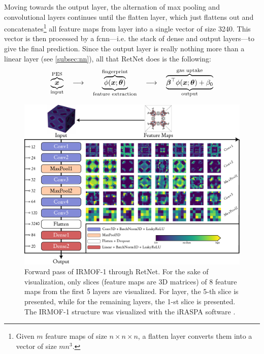 Moving towards the output layer, the alternation of max pooling and
convolutional layers continues until the flatten layer,
which just flattens out and concatenates\footnote{Given $m$ feature maps of size
$n \times n \times n$, a flatten layer converts them into a vector of size
$mn^3$.} all feature maps from  layer into a single vector of size
\num{3240}. This vector is then processed by a \gls{fcnn}---i.e. the stack of
dense and output layers---to give the final prediction. Since
the output layer is really nothing more than a linear
layer (see \Section{} \ref{subsec:nn}), all that RetNet does
is the following:
\begin{equation}
	\label{eq:retnet}
	\underbrace{\overbrace{\boldsymbol{x}}^\text{PES}}_\text{input}
	\quad \longrightarrow \quad
	\underbrace{
		\overbrace{\phi(\boldsymbol{x};\boldsymbol{\theta})}
		^\text{fingerprint}
	}_\text{feature extraction}
	\quad \longrightarrow \quad
	\underbrace{
		\overbrace{\boldsymbol{\beta}^\top\phi(\boldsymbol{x};\boldsymbol{\theta}) + \beta_0}
		^\text{gas uptake}
	}_\text{output}
\end{equation}

\begin{figure}
	\centering
	\includegraphics[width=\textwidth]{fig/forward_pass.pdf}
	\caption[RetNet architecture.]{Forward pass of
	IRMOF-1 through RetNet. For the sake of
	visualization, only slices (feature maps are 3D matrices)
	of 8 feature maps from the first 5 layers are visualized. For 
	layer, the 5-th slice is presented, while for the remaining layers, the 1-st
	slice is presented. The IRMOF-1 structure was visualized with the iRASPA
	software \parencite{Dubbeldam2018}.}
	\label{fig:retnet}
\end{figure}


